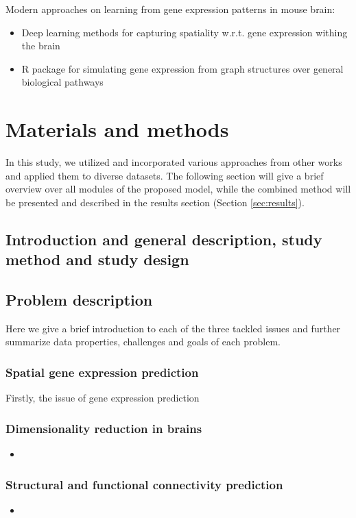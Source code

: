 \documentclass[]{article}
\renewcommand{\cite}{\citep}
\begin{document}
Modern approaches on learning from gene expression patterns in mouse brain:
\begin{itemize}
	\item Deep learning methods for capturing spatiality w.r.t. gene expression withing the brain \cite{zeng_deep_2015}
	\item R package for simulating gene expression from graph structures over general biological pathways \cite{kelly_graphsim_2020} 
\end{itemize}



\newpage
\section{Materials and methods}
\label{sec:methods}
In this study, we utilized and incorporated various approaches from other works and applied them to diverse datasets. The following section will give a brief overview over all modules of the proposed model, while the combined method will be presented and described in the results section (Section \ref{sec:results}).
\subsection*{Introduction and general description, study method and study design}
\subsection{Problem description}
\label{sec:probdesc}
Here we give a brief introduction to each of the three tackled issues and further summarize data properties, challenges and goals of each problem. 
\subsubsection{Spatial gene expression prediction}
Firstly, the issue of gene expression prediction 

\subsubsection{Dimensionality reduction in brains}
\begin{itemize}
	\item 
\end{itemize}

\subsubsection{Structural and functional connectivity prediction}
\begin{itemize}
	\item 
\end{itemize}
\end{document}
